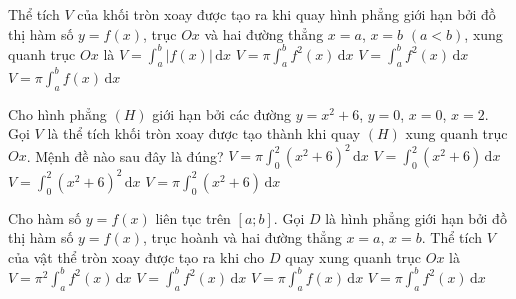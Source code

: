 

\begin{ex}%
	Thể tích $V$ của khối tròn xoay được tạo  ra khi quay hình phẳng giới hạn bởi đồ thị hàm số $y=f(x)$, trục $Ox$ và hai đường thẳng $x=a$, $x=b$ $(a<b)$, xung quanh trục $Ox$ là
	\choice 
		{$V=\displaystyle\int_{a}^{b} |f(x)|\mathrm{\,d}{x}$} 
		 {\True $V=\pi\displaystyle\int_{a}^{b} f^2(x)\mathrm{\,d}{x}$}
		{$V=\displaystyle\int_{a}^{b} f^2(x)\mathrm{\,d}{x}$} 
		 {$V=\pi\displaystyle\int_{a}^{b} f(x)\mathrm{\,d}{x}$}
\end{ex}

\begin{ex}%
	Cho hình phẳng $(H)$ giới hạn bởi các đường $y=x^2+6$, $y=0$, $x=0$,  $x=2$. Gọi $V$ là thể tích khối tròn xoay được tạo thành khi quay $(H)$ xung quanh trục $Ox$. Mệnh đề nào sau đây là đúng?
	\choice 
		 {\True $V=\pi\displaystyle\int_{0}^{2}\left(x^2+6\right)^2\mathrm{\,d}x$}
		 {$V=\displaystyle\int_{0}^{2}\left(x^2+6\right)\mathrm{\,d}x$}
		 {$V=\displaystyle\int_{0}^{2}\left(x^2+6\right)^2\mathrm{\,d}x$}
		{$V=\pi\displaystyle\int_{0}^{2}\left(x^2+6\right)\mathrm{\,d}x$} 
\end{ex}

\begin{ex}%
	Cho hàm số $y=f(x)$ liên tục trên $[a;b]$. Gọi $D$ là hình phẳng giới hạn bởi đồ thị hàm số $y=f(x)$, trục hoành và hai đường thẳng $x=a$, $x=b$. Thể tích $V$ của vật thể  tròn xoay được tạo ra khi cho $D$ quay xung quanh trục $Ox$ là
	 \choice
		{$V=\pi^2 \displaystyle\int_a^b f^2(x)\mathrm{\,d}x$} 
		{$V=\displaystyle\int_a^b  f^2(x)\mathrm{\,d}x$}
		{$V=\pi\displaystyle\int_a^b  f(x)\mathrm{\,d}x$}
		 {\True $V=\pi\displaystyle\int_a^b f^2(x)\mathrm{\,d}x$}
\end{ex}

